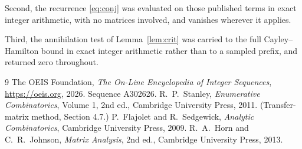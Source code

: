 \documentclass[11pt,a4paper]{article}
\theoremstyle{plain}
\theoremstyle{definition}
\begin{document}
Second, the recurrence \eqref{eq:conj} was evaluated on those published terms in exact
integer arithmetic, with no matrices involved, and vanishes wherever it applies.

Third, the annihilation test of Lemma~\ref{lem:crit} was carried to the full
Cayley--Hamilton bound in exact integer arithmetic rather than to a sampled prefix, and
returned zero throughout.

\begin{thebibliography}{9}
 The OEIS Foundation, \emph{The On-Line Encyclopedia of Integer
Sequences}, \url{https://oeis.org}, 2026. Sequence A302626.
 R.~P.~Stanley, \emph{Enumerative Combinatorics}, Volume 1, 2nd ed.,
Cambridge University Press, 2011. (Transfer-matrix method, Section 4.7.)
 P.~Flajolet and R.~Sedgewick, \emph{Analytic Combinatorics}, Cambridge
University Press, 2009.
 R.~A.~Horn and C.~R.~Johnson, \emph{Matrix Analysis}, 2nd ed., Cambridge
University Press, 2013.
\end{thebibliography}
\end{document}

